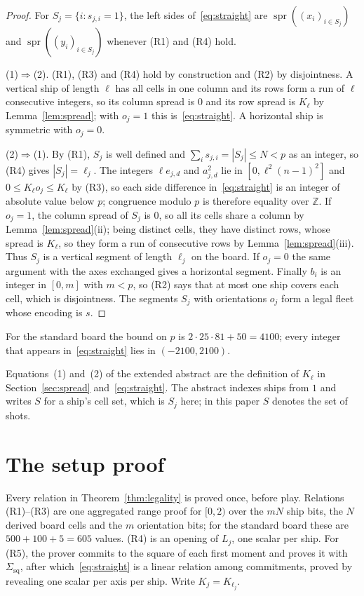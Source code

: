 \documentclass[11pt]{article}
\theoremstyle{definition}
\theoremstyle{remark}
\newcommand{\Z}{\mathbb{Z}}
\newcommand{\spr}{\operatorname{spr}}
\newcommand{\Sq}{\Sigma_{\mathrm{sq}}}
\begin{document}
\begin{proof}
For $S_j=\{i:s_{j,i}=1\}$, the left sides of~\eqref{eq:straight} are $\spr((x_i)_{i\in S_j})$ and $\spr((y_i)_{i\in S_j})$ whenever (R1) and (R4) hold.

(1)$\Rightarrow$(2). (R1), (R3) and (R4) hold by construction and (R2) by disjointness. A vertical ship of length $\ell$ has all cells in one column and its rows form a run of $\ell$ consecutive integers, so its column spread is $0$ and its row spread is $K_\ell$ by Lemma~\ref{lem:spread}; with $o_j=1$ this is~\eqref{eq:straight}. A horizontal ship is symmetric with $o_j=0$.

(2)$\Rightarrow$(1). By (R1), $S_j$ is well defined and $\sum_is_{j,i}=|S_j|\le N<p$ as an integer, so (R4) gives $|S_j|=\ell_j$. The integers $\ell e_{j,d}$ and $a_{j,d}^2$ lie in $[0,\ell^2(n-1)^2]$ and $0\le K_\ell o_j\le K_\ell$ by (R3), so each side difference in~\eqref{eq:straight} is an integer of absolute value below $p$; congruence modulo $p$ is therefore equality over $\Z$. If $o_j=1$, the column spread of $S_j$ is $0$, so all its cells share a column by Lemma~\ref{lem:spread}(ii); being distinct cells, they have distinct rows, whose spread is $K_\ell$, so they form a run of consecutive rows by Lemma~\ref{lem:spread}(iii). Thus $S_j$ is a vertical segment of length $\ell_j$ on the board. If $o_j=0$ the same argument with the axes exchanged gives a horizontal segment. Finally $b_i$ is an integer in $[0,m]$ with $m<p$, so (R2) says that at most one ship covers each cell, which is disjointness. The segments $S_j$ with orientations $o_j$ form a legal fleet whose encoding is $s$.
\end{proof}

For the standard board the bound on $p$ is $2\cdot25\cdot81+50=4100$; every integer that appears in~\eqref{eq:straight} lies in $(-2100,2100)$.

Equations~(1) and~(2) of the extended abstract are the definition of $K_\ell$ in Section~\ref{sec:spread} and~\eqref{eq:straight}. The abstract indexes ships from $1$ and writes $S$ for a ship's cell set, which is $S_j$ here; in this paper $S$ denotes the set of shots.

\section{The setup proof}\label{sec:setup}
Every relation in Theorem~\ref{thm:legality} is proved once, before play. Relations (R1)--(R3) are one aggregated range proof for $[0,2)$ over the $mN$ ship bits, the $N$ derived board cells and the $m$ orientation bits; for the standard board these are $500+100+5=605$ values. (R4) is an opening of $L_j$, one scalar per ship. For (R5), the prover commits to the square of each first moment and proves it with $\Sq$, after which~\eqref{eq:straight} is a linear relation among commitments, proved by revealing one scalar per axis per ship. Write $K_j=K_{\ell_j}$.
\end{document}
